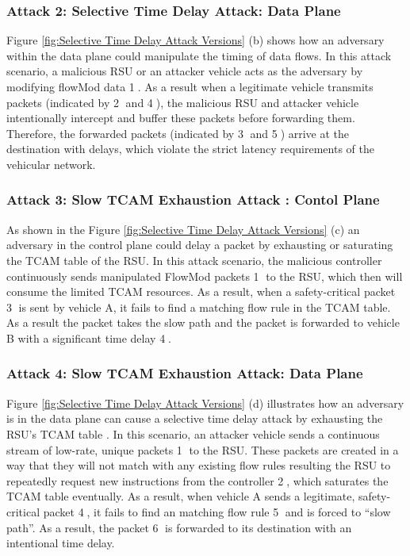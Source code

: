 \documentclass[12pt, a4paper]{report}
\begin{document}
\begin{itemize}
  \subsubsection{Attack 2: Selective Time Delay Attack: Data Plane}
 Figure \ref{fig:Selective Time Delay Attack Versions} (b) shows how an adversary within the data plane could manipulate the timing of data flows. In this attack scenario, a malicious RSU or an attacker vehicle acts as the adversary by modifying flowMod data \textcircled{1}. As a result when a legitimate vehicle transmits packets (indicated by \textcircled{2} and \textcircled{4}), the malicious RSU and attacker vehicle intentionally intercept and buffer these packets before forwarding them. Therefore, the forwarded packets (indicated by  \textcircled{3} and \textcircled{5}) arrive at the destination with delays, which violate the strict latency requirements of the vehicular network.

 \subsubsection{Attack 3: Slow TCAM Exhaustion Attack : Contol Plane}
  As shown in the Figure \ref{fig:Selective Time Delay Attack Versions} (c) an adversary in the control plane could delay a packet by exhausting or saturating the TCAM table of the RSU. In this attack scenario, the malicious controller continuously sends manipulated FlowMod packets \textcircled{1} to the RSU, which then will consume the limited TCAM resources. As a result, when a safety-critical packet \textcircled{3} is sent by vehicle A, it fails to find a matching flow rule in the TCAM table. As a result the packet takes the slow path and the packet is forwarded to vehicle B with a significant time delay \textcircled{4}.

  \subsubsection{Attack 4: Slow TCAM Exhaustion Attack: Data Plane}
   Figure \ref{fig:Selective Time Delay Attack Versions} (d) illustrates how an adversary is in the data plane can cause a selective time delay attack by exhausting the RSU's TCAM table \cite{PASCOAL2020107223}\cite{pascoal2017slow}. In this scenario, an attacker vehicle sends a continuous stream of low-rate, unique packets \textcircled{1} to the RSU. These packets are created in a way that they will not match with any existing flow rules resulting the RSU to repeatedly request new instructions from the controller \textcircled{2}, which  saturates the TCAM table eventually. As a result, when vehicle A sends a legitimate, safety-critical packet \textcircled{4}, it fails to find an matching flow rule \textcircled{5} and is forced to ``slow path''\cite{9356082}\cite{7929710}. As a result, the packet \textcircled{6} is forwarded to its destination with an intentional time delay.
   

\end{itemize}
\end{document}
